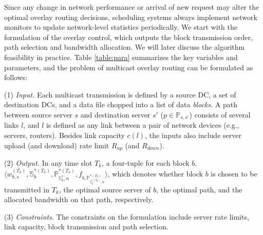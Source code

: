 Since any change in network performance or arrival of
new request may alter the optimal overlay
routing decisions, scheduling systems always implement network monitors to update network-level statistics periodically. We start with the formulation of the overlay control, which outputs the block transmission order, path selection and bandwidth allocation. We will later discuss the algorithm feasibility in practice.
Table \ref{table:para} summarizes the key variables and parameters, and the problem of multicast overlay routing can be formulated as follows:


\noindent(1) {\em Input.} %
Each multicast transmission is defined
by a source DC, a set of destination DCs, and a data file chopped into
a list of data {\em blocks}.
A path between source server $s$ and destination server $s'$ ($p\in \mathbb{P}_{s,s'}$) consists of several links $l$, and $l$ is defined as any link between a pair of network devices (e.g., servers, routers).
Besides link capacity $c(l)$, the inputs also include
server upload (and download) rate limit $R_{up}$ (and $R_{down}$).

\noindent(2) {\em Output.} In any time slot $T_k$, a four-tuple for each block $b$. $\langle w^{(T_k)}_{b,s}, \mathbb{S}^{*(T_k)}_{b}, \mathbb{P}^{*(T_k)}_{\mathbb{S}^*_{b},n}, f_{b,\mathbb{P}^{*(T_k)}_{\mathbb{S}^{*(T_k)}_{b},n}} \rangle$, which denotes whether block $b$ is chosen to be transmitted in $T_k$, the optimal source server of $b$, the optimal path, and the allocated bandwidth on that path, respectively.

\noindent(3) {\em Constraints.}
The constraints on the formulation include server rate limits, link capacity, block transmission and path selection.

